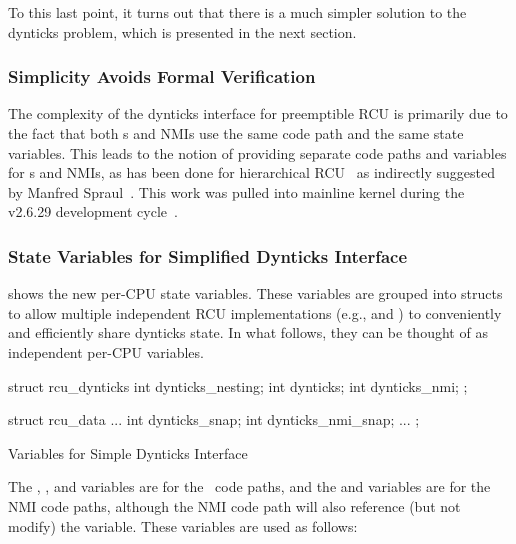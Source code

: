 To this last point, it turns out that there is a much simpler solution to
the dynticks problem, which is presented in the next section.

\subsubsection{Simplicity Avoids Formal Verification}
\label{sec:formal:Simplicity Avoids Formal Verification}

The complexity of the dynticks interface for preemptible RCU is primarily
due to the fact that both \IRQ s and NMIs use the same code path and the
same state variables.
This leads to the notion of providing separate code paths and variables
for \IRQ s and NMIs, as has been done for
hierarchical RCU~\cite{PaulEMcKenney2008HierarchicalRCU}
as indirectly suggested by
Manfred Spraul~\cite{ManfredSpraul2008StateMachineRCU}.
This work was pulled into mainline kernel during the v2.6.29
development cycle~\cite{PaulEMcKenney2008commit:64db4cfff99c}.

\subsubsection{State Variables for Simplified Dynticks Interface}
\label{sec:formal:State Variables for Simplified Dynticks Interface}

shows the new per-CPU state variables.
These variables are grouped into structs to allow multiple independent
RCU implementations (e.g.,  and ) to conveniently
and efficiently share dynticks state.
In what follows, they can be thought of as independent per-CPU variables.

\begin{listing}
\begin{VerbatimL}
struct rcu_dynticks {
	int dynticks_nesting;
	int dynticks;
	int dynticks_nmi;
};

struct rcu_data {
	...
	int dynticks_snap;
	int dynticks_nmi_snap;
	...
};
\end{VerbatimL}
\caption{Variables for Simple Dynticks Interface}
\label{lst:formal:Variables for Simple Dynticks Interface}
\end{listing}

The , , and  variables
are for the \IRQ\ code paths, and the  and
 variables are for the NMI code paths, although
the NMI code path will also reference (but not modify) the
 variable.
These variables are used as follows:

